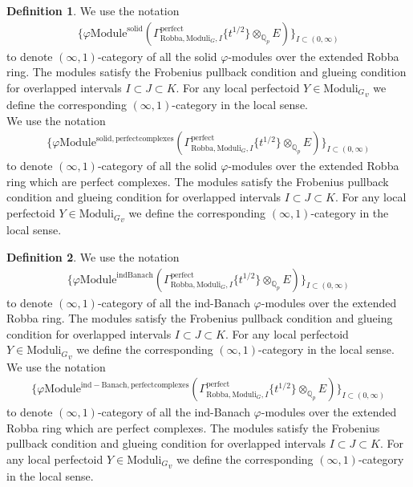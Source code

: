 \documentclass[12pt]{book}
\theoremstyle{definition}
\newtheorem{definition}{Definition}
\begin{document}
\begin{definition}
We use the notation
\begin{align}
\{\varphi\mathrm{Module}^{\mathrm{solid}}(\Gamma^\text{perfect}_{\text{Robba},{\mathrm{Moduli}_G},I}\{t^{1/2}\}\otimes_{\mathbb{Q}_p}E)\}_{I\subset (0,\infty)}
\end{align}
to denote $(\infty,1)$-category of all the solid $\varphi$-modules over the extended Robba ring. The modules satisfy the Frobenius pullback condition and glueing condition for overlapped intervals $I\subset J\subset K$. For any local perfectoid $Y\in {\mathrm{Moduli}_G}_v$ we define the corresponding $(\infty,1)$-category in the local sense.\\
We use the notation
\begin{align}
\{\varphi\mathrm{Module}^{\mathrm{solid,perfectcomplexes}}(\Gamma^\text{perfect}_{\text{Robba},{\mathrm{Moduli}_G},I}\{t^{1/2}\}\otimes_{\mathbb{Q}_p}E)\}_{I\subset (0,\infty)}
\end{align}
to denote $(\infty,1)$-category of all the solid $\varphi$-modules over the extended Robba ring which are perfect complexes. The modules satisfy the Frobenius pullback condition and glueing condition for overlapped intervals $I\subset J\subset K$. For any local perfectoid $Y\in {\mathrm{Moduli}_G}_v$ we define the corresponding $(\infty,1)$-category in the local sense. 

\end{definition}


\begin{definition}
We use the notation
\begin{align}
\{\varphi\mathrm{Module}^{\mathrm{indBanach}}(\Gamma^\text{perfect}_{\text{Robba},{\mathrm{Moduli}_G},I}\{t^{1/2}\}\otimes_{\mathbb{Q}_p}E)\}_{I\subset (0,\infty)}
\end{align}
to denote $(\infty,1)$-category of all the ind-Banach $\varphi$-modules over the extended Robba ring. The modules satisfy the Frobenius pullback condition and glueing condition for overlapped intervals $I\subset J\subset K$. For any local perfectoid $Y\in {\mathrm{Moduli}_G}_v$ we define the corresponding $(\infty,1)$-category in the local sense.\\
We use the notation
\begin{align}
\{\varphi\mathrm{Module}^{\mathrm{ind-Banach,perfectcomplexes}}(\Gamma^\text{perfect}_{\text{Robba},{\mathrm{Moduli}_G},I}\{t^{1/2}\}\otimes_{\mathbb{Q}_p}E)\}_{I\subset (0,\infty)}
\end{align}
to denote $(\infty,1)$-category of all the ind-Banach $\varphi$-modules over the extended Robba ring which are perfect complexes. The modules satisfy the Frobenius pullback condition and glueing condition for overlapped intervals $I\subset J\subset K$. For any local perfectoid $Y\in {\mathrm{Moduli}_G}_v$ we define the corresponding $(\infty,1)$-category in the local sense. 

\end{definition}
\end{document}
